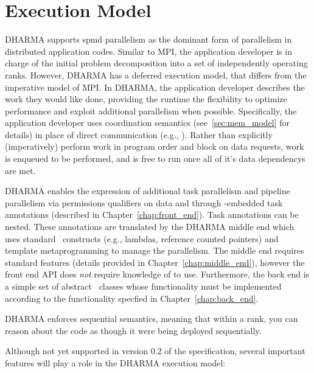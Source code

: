 \section{Execution Model}
\label{sec:exec_model}
DHARMA supports \gls{spmd} parallelism as the dominant form of parallelism in
distributed application codes. Similar to \gls{MPI}, the application developer
is in charge of the initial problem decomposition into a set of
independently operating \glspl{rank}. 
However, DHARMA has a \gls{deferred} \gls{execution model}, that differs from the
\gls{imperative} model of \gls{MPI}.
In DHARMA, the application developer describes the
work they would like done, providing the runtime the flexibility to optimize performance and
exploit additional parallelism when possible.    
Specifically, the application developer uses \gls{coordination semantics}
(see~\ref{sec:mem_model} for details) in place of direct communication (e.g.,
    ).  Rather than explicitly (imperatively)
perform work in program order and block on data requests, work is enqueued to
be performed, and is free to run once all of it's data \glspl{dependency} are met.


DHARMA enables the expression of additional \gls{task parallelism} and
\gls{pipeline parallelism} via permissions qualifiers on data 
and through \CC-embedded task annotations (described in
    Chapter~\ref{chap:front_end}). Task annotations can be nested.
These annotations are translated by
the DHARMA \gls{middle end} which uses standard \CC\ constructs (e.g., lambdas,
  reference counted pointers) and \gls{template
metaprogramming} to manage the parallelism.  The \gls{middle end} requires
 standard features (details provided in Chapter~\ref{chap:middle_end}), 
  however the \gls{front end} \gls{API} does \emph{not}
require knowledge of  to use. Furthermore, the \gls{back end} is a
simple set of abstract \CC\ classes whose functionality must be implemented
according to the functionality specfied in Chapter~\ref{chap:back_end}.

DHARMA enforces \gls{sequential semantics}, meaning that within a \gls{rank}, you can reason about the code as
though it were being deployed sequentially.   


Although not yet supported in version 0.2 of the specification, several
important features will play a role in the DHARMA execution model:

